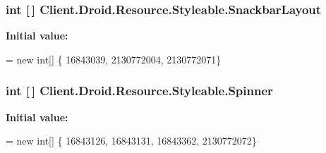 \subsubsection[{Snackbar\+Layout}]{\setlength{\rightskip}{0pt plus 5cm}int \mbox{[}$\,$\mbox{]} Client.\+Droid.\+Resource.\+Styleable.\+Snackbar\+Layout\hspace{0.3cm}{\ttfamily [static]}}\label{classClient_1_1Droid_1_1Resource_1_1Styleable_a6b2d1e8d632dca04bdce7f8dfa7e5bd2}
{\bfseries Initial value\+:}
\begin{DoxyCode}
= \textcolor{keyword}{new} \textcolor{keywordtype}{int}[]
            \{
                    16843039,
                    2130772004,
                    2130772071\}
\end{DoxyCode}
\hypertarget{classClient_1_1Droid_1_1Resource_1_1Styleable_a8532bfe50c7e603d0c92ffd50334b77b}{}
\subsubsection[{Spinner}]{\setlength{\rightskip}{0pt plus 5cm}int \mbox{[}$\,$\mbox{]} Client.\+Droid.\+Resource.\+Styleable.\+Spinner\hspace{0.3cm}{\ttfamily [static]}}\label{classClient_1_1Droid_1_1Resource_1_1Styleable_a8532bfe50c7e603d0c92ffd50334b77b}
{\bfseries Initial value\+:}
\begin{DoxyCode}
= \textcolor{keyword}{new} \textcolor{keywordtype}{int}[]
            \{
                    16843126,
                    16843131,
                    16843362,
                    2130772072\}
\end{DoxyCode}
\hypertarget{classClient_1_1Droid_1_1Resource_1_1Styleable_a85856c936494dfcaf611d99a3fea82c4}{}
